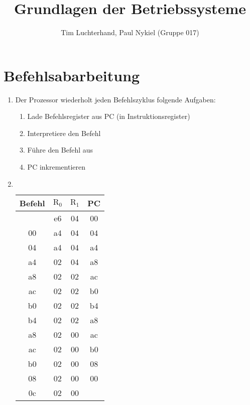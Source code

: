\documentclass[DIN, pagenumber=false, fontsize=11pt, parskip=half]{scrartcl}
\title{Grundlagen der Betriebssysteme}
\author{Tim Luchterhand, Paul Nykiel (Gruppe 017)}
\begin{document}
    \maketitle
    \section{Befehlsabarbeitung}
    \begin{enumerate}[label=(\alph*)]
        \item 
            Der Prozessor wiederholt jeden Befehlszyklus folgende Aufgaben:
            \begin{enumerate}
                \item Lade Befehlsregister aus PC (in Instruktionsregister)
                \item Interpretiere den Befehl
                \item Führe den Befehl aus
                \item PC inkrementieren
            \end{enumerate}
        \item $ $
            \begin{table}[H]
                \centering
                \begin{tabular}{cccc}
                    \toprule
                    Befehl & $\text{R}_0$ & $\text{R}_1$ & PC \\
                    \midrule
                       & e6 & 04 & 00 \\
                    00 & a4 & 04 & 04 \\
                    04 & a4 & 04 & a4 \\
                    a4 & 02 & 04 & a8 \\
                    a8 & 02 & 02 & ac \\
                    ac & 02 & 02 & b0 \\
                    b0 & 02 & 02 & b4 \\
                    b4 & 02 & 02 & a8 \\
                    a8 & 02 & 00 & ac \\
                    ac & 02 & 00 & b0 \\
                    b0 & 02 & 00 & 08 \\
                    08 & 02 & 00 & 00 \\
                    0c & 02 & 00 &    \\
                    \bottomrule
                \end{tabular}
            \end{table}
    \end{enumerate}
\end{document}
